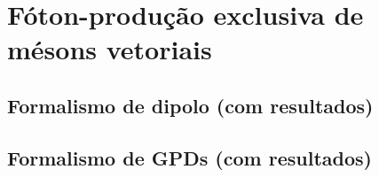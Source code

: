 \chapter{Fóton-produção exclusiva de mésons vetoriais}
\section{Formalismo de dipolo (com resultados)}
\section{Formalismo de GPDs (com resultados)}
